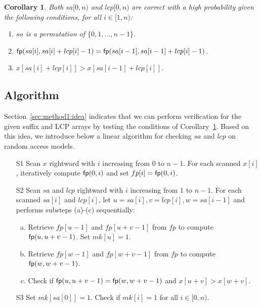 \documentclass[10pt,journal,compsoc]{IEEEtran}
\newtheorem{Corollary}{Corollary}
\begin{document}
\begin{Corollary} \label{corollary:1}
	Both $sa[0, n)$ and $lcp[0, n)$ are correct with a high probability given the following conditions, for all $i \in [1, n)$:
	
	\begin{enumerate}[(1)]
		\item
		$sa$ is a permutation of $\{0, 1, \dots, n - 1\}$.
		
		\item
		${\sf fp}(sa[i], sa[i] + lcp[i] - 1) = {\sf fp}(sa[i - 1], sa[i - 1] + lcp[i] - 1)$.
		
		\item
		$x[sa[i] + lcp[i]] > x[sa[i - 1] + lcp[i]]$.
	\end{enumerate}
\end{Corollary}


\subsection{Algorithm} \label{sec:method1:algorithm}

Section~\ref{sec:method1:idea} indicates that we can perform verification for the given suffix and LCP arrays by testing the conditions of Corollary~\ref{corollary:1}. Based on this idea, we introduce below a linear algorithm for checking $sa$ and $lcp$ on random access models.

\begin{enumerate}
	\item [S1]
	Scan $x$ rightward with $i$ increasing from $0$ to $n - 1$. For each scanned $x[i]$, iteratively compute ${\sf fp}(0, i)$ and set $fp[i] = {\sf fp}(0, i)$.
	
	\item [S2]
	Scan $sa$ and $lcp$ rightward with $i$ increasing from $1$ to $n - 1$. For each scanned $sa[i]$ and $lcp[i]$, let $u = sa[i], v = lcp[i], w = sa[i - 1]$ and performs substeps (a)-(c) sequentially:
	
	\begin{enumerate}[(a)]
		\item 
		Retrieve $fp[u - 1]$ and $fp[u + v - 1]$ from $fp$ to compute ${\sf fp}(u, u + v - 1)$. Set $mk[u] = 1$.
		
		\item 
		Retrieve $fp[w - 1]$ and $fp[w + v - 1]$ from $fp$ to compute ${\sf fp}(w, w + v - 1)$. 
		
		\item 
		Check if ${\sf fp}(u, u + v - 1) = {\sf fp}(w, w + v - 1)$ and $x[u + v] > x[w + v]$.
	\end{enumerate}

	\item [S3] Set $mk[sa[0]] = 1$. Check if $mk[i] = 1$ for all $i \in [0, n)$.
	
\end{enumerate}
\end{document}
